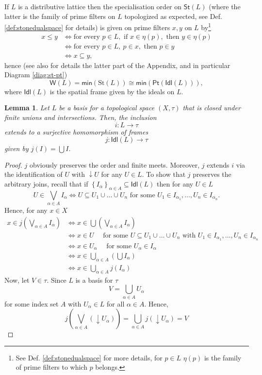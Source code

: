 \documentclass{article}
\theoremstyle{plain}
\newtheorem{lemma}[theorem]{Lemma}
\theoremstyle{definition}
\theoremstyle{remark}
\newcommand{\bool}[1]{\mathsf{#1}}
\newcommand{\cp}[1]{\left( #1 \right)}
\newcommand{\bp}[1]{\left\lbrace #1 \right\rbrace}
\newcommand{\0}{\mathbbm 0}
\newcommand{\1}{\mathbbm 1}
\newcommand{\2}{\mathbbm 2}
\begin{document}
If \(L\) is a distributive lattice then the specialisation order on \(\bool{St}(L)\) (where the latter is the family of prime filters on $L$ topologized as expected, see Def. \ref{def:stonedualspace} for details) 
is given on prime filters $x,y$ on $L$ by\footnote{See Def. \ref{def:stonedualspace} for more details, for $p\in L$ $\eta(p)$ is the family of prime filters to which $p$ belongs.} \begin{align*}
    x \leq y &\iff \text{for every } p \in L, \text{ if } x \in \eta(p), \text{ then } y \in \eta(p) \\ &\iff \text{for every } p \in L,  \ p \in x, \text{ then } p \in y \\  &\iff x \subseteq y,
\end{align*} 
hence (see also for details the latter part of the Appendix, and in particular Diagram \ref{diag:st-pt})
\[
\bool{W}(L) = \bool{min}(\mathrm{St}(L)) \cong \bool{min}(\bool{Pt}(\bool{Idl}(L))),
\]
where $\bool{Idl}(L)$ is the spatial frame given by the ideals on $L$.
\begin{lemma}
    \label{lemma:ideal-cmp&top}
    Let \(L\) be a basis for a topological space \((X,\tau)\) that is closed under finite unions and intersections. Then, the inclusion \[
i : L \to \tau
\]
extends to a surjective homomorphism of frames \[
j: \bool{Idl}(L) \to \tau
\]
given by \(j(I) = \bigcup I \). 
\end{lemma}
\begin{proof}
\(j\)  obviously preserves the order and finite meets. Moreover, \( j \) extends \( i \) via the identification of \( U \) with \( \downarrow U \) for any \( U \in L \).
To show that \(j\) preserves the arbitrary joins, recall that if \(\bp{I_\alpha}_{\alpha \in A} \subseteq \bool{Idl}(L)\) then for any \(U \in L\)
\[
U \in \bigvee_{\alpha \in A} I_\alpha \iff U \subseteq U_1 \cup \dots \cup U_n 
\text{ for some } U_1 \in I_{\alpha_1}, \dots, U_n \in  I_{\alpha_n}. \] 
Hence, for any \(x \in X\)
\begin{align*}
    x \in j (\bigvee_{\alpha \in A} I_\alpha) &\iff x \in \bigcup \cp{ \bigvee_{\alpha \in A} I_\alpha} \\ &\iff x \in U \quad \text{ for some } U \subseteq U_1 \cup \dots \cup U_n   \text{ with }U_1 \in I_{\alpha_1}, \dots, U_n \in  I_{\alpha_n} 
    \\
    &\iff x \in U_\alpha \quad \text{ for some } U_\alpha \in  I_{\alpha} 
    \\
    &\iff x \in \bigcup_{\alpha \in A} \cp{ \bigcup I_\alpha} \\
     &\iff x \in \bigcup_{\alpha \in A} j(I_\alpha)
\end{align*}
Now, let \(V \in \tau\). Since \(L\) is a basis for \(\tau\)
\[
V = \bigcup_{\alpha \in A} U_\alpha
\]
for some index set $A$ with \( U_\alpha \in L\) for all \(\alpha \in A\). Hence, \[j\cp{\bigvee_{\alpha \in A} \cp{\downarrow U_\alpha}} = \bigcup_{\alpha \in A} j(\downarrow U_\alpha)=  V\]
\end{proof}
\end{document}
